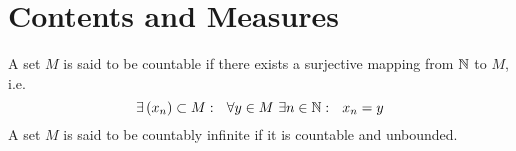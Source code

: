 \documentclass[../../script.tex]{subfiles}
\begin{document}
\section{Contents and Measures}

\begin{defi}
    A set $M$ is said to be countable if there exists a surjective mapping from $\mathbb{N}$ to $M$, i.e.
    \[
        \exists \left(x_n\right) \subset M: ~~\forall y \in M ~\exists n \in \mathbb{N}: ~~x_n = y
    \]
    A set $M$ is said to be countably infinite if it is countable and unbounded.
\end{defi}
\end{document}
